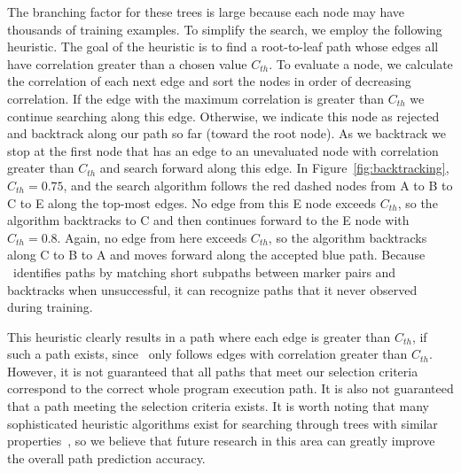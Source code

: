 The branching factor for these trees is large because each node may have thousands of training examples. To simplify the search, we employ the following heuristic. The goal of the heuristic is to find a root-to-leaf path whose edges all have correlation greater than a chosen value $C_{th}$. To evaluate a node, we calculate the correlation of each next edge and sort the nodes in order of decreasing correlation. If the edge with the maximum correlation is greater than $C_{th}$ we continue searching along this edge. Otherwise, we indicate this node as rejected and backtrack along our path so far (\ie toward the root node). As we backtrack we stop at the first node that has an edge to an unevaluated node with correlation greater than $C_{th}$ and search forward along this edge.  In Figure~\ref{fig:backtracking}, $C_{th} = 0.75$, and the search algorithm follows the red dashed nodes from A to B to C to E along the top-most edges. No edge from this E node exceeds $C_{th}$, so the algorithm backtracks to C and then continues forward to the E node with $C_{th} = 0.8$. Again, no edge from here exceeds $C_{th}$, so the algorithm backtracks along C to B to A and moves forward along the accepted blue path.
Because \zop\ identifies paths by matching short subpaths between marker pairs and backtracks when unsuccessful, it can recognize paths that it never observed during training.

This heuristic clearly results in a path where each edge is greater than $C_{th}$, if such a path exists, since \zop\ only follows edges with correlation greater than $C_{th}$. However, it is not guaranteed that all paths that meet our selection criteria correspond to the correct whole program execution path. It is also not guaranteed that a path meeting the selection criteria exists.
It is worth noting that many sophisticated heuristic algorithms exist for searching through trees with similar properties~\cite{browne2012,ruml2002,korf1985,biglieri1991}, so we believe that future research in this area can greatly improve the overall path prediction accuracy.


